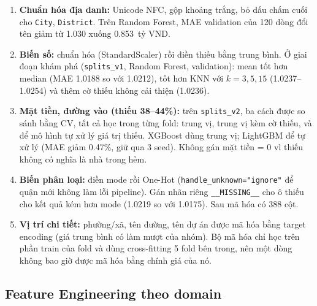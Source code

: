\documentclass[11pt]{article}
\newcommand{\ty}{tỷ VND}
\begin{document}
\begin{enumerate}
    \item \textbf{Chuẩn hóa địa danh:} Unicode NFC, gộp khoảng trắng, bỏ dấu chấm cuối cho \texttt{City},
          \texttt{District}. Trên Random Forest, MAE validation của 120 dòng đổi tên giảm từ 1.030 xuống
          0.853~\ty.
    \item \textbf{Biến số:} chuẩn hóa (StandardScaler) rồi điền thiếu bằng trung bình. Ở giai đoạn khám phá
          (\texttt{splits\_v1}, Random Forest, validation): mean tốt hơn median (MAE 1.0188 so với 1.0212), tốt hơn
          KNN với $k = 3, 5, 15$ (1.0237--1.0254) và thêm cờ thiếu không cải thiện (1.0236).
    \item \textbf{Mặt tiền, đường vào (thiếu 38--44\%):} trên \texttt{splits\_v2}, ba cách được so sánh bằng CV,
          tất cả học trong từng fold: trung vị, trung vị kèm cờ thiếu, và để mô hình tự xử lý giá trị thiếu.
          XGBoost dùng trung vị; LightGBM để tự xử lý (MAE giảm 0.47\%, giữ qua 3 seed). Không gán mặt tiền = 0
          vì thiếu không có nghĩa là nhà trong hẻm.
    \item \textbf{Biến phân loại:} điền mode rồi One-Hot (\texttt{handle\_unknown="ignore"} để quận mới
          không làm lỗi pipeline). Gán nhãn riêng \texttt{\_\_MISSING\_\_} cho ô thiếu cho kết quả kém hơn mode
          (1.0219 so với 1.0175). Sau mã hóa có 388 cột.
    \item \textbf{Vị trí chi tiết:} phường/xã, tên đường, tên dự án được mã hóa bằng target encoding
          (giá trung bình có làm mượt của nhóm). Bộ mã hóa chỉ học trên phần train của fold và dùng
          cross-fitting 5 fold bên trong, nên một dòng không bao giờ được mã hóa bằng chính giá của nó.
\end{enumerate}

\subsection{Feature Engineering theo domain}
\end{document}
